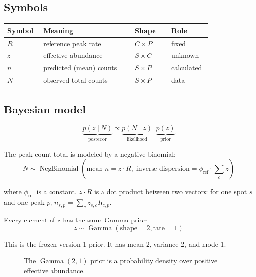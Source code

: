 \documentclass[11pt]{article}
\newcommand{\NB}{\operatorname{NegBinomial}}
\newcommand{\Gam}{\operatorname{Gamma}}
\begin{document}
\subsection{Symbols}

\begin{center}
\begin{tabular}{C{0.12\linewidth}L{0.40\linewidth}C{0.16\linewidth}L{0.14\linewidth}}
\toprule
Symbol & Meaning & Shape & Role \\
\midrule
\(R\) & reference peak rate & \(C\times P\) & fixed \\
\(z\) & effective abundance & \(S\times C\)  & unknown \\
\(n\) & predicted (mean) counts & \(S\times P\)  & calculated \\
\(N\) & observed total counts & \(S\times P\)  & data \\
\bottomrule
\end{tabular}
\end{center}

\subsection{Bayesian model}

\[
\underbrace{p(z\mid N)}_{\text{posterior}}
\propto
\underbrace{p(N \mid z)}_{\text{likelihood}} \cdot
\underbrace{p(z)}_{\text{prior}}
\]

The peak count total is modeled by a negative binomial:
\[
\boxed{
N\sim\NB\!\left(
\text{mean } n=z \cdot R,\;
\text{inverse-dispersion}=\phi_{\mathrm{ref}} \cdot \sum_c{z}
\right)
}
\]

where $\phi_{\mathrm{ref}}$ is a constant. $z \cdot R$ is a dot product between two
vectors: for one spot $s$ and one peak $p$, $n_{s,p}=\sum_c z_{s,c}R_{c,p}$.



Every element of $z$ has the same Gamma prior:
\[
\boxed{z\sim\Gam(\text{shape}=2,\text{rate}=1)}
\]

This is the frozen version-1 prior. It has mean 2, variance 2, and mode 1.

\begin{figure}[H]
\centering
{}
\caption{The \(\Gam(2,1)\) prior is a probability density over positive effective abundance.}
\end{figure}
\end{document}
